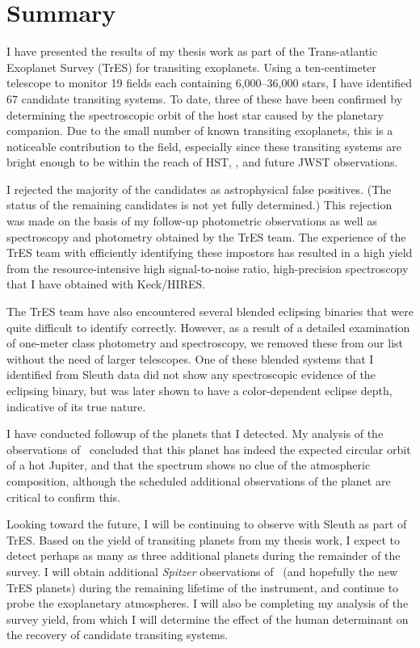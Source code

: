 \chapter[Summary]{%
Summary}
\label{cha:discuss}

I have presented the results of my thesis work as part of the Trans-atlantic Exoplanet Survey (TrES) for transiting exoplanets.
Using a ten-centimeter telescope to monitor 19 fields each containing 6,000--36,000 stars, I have identified 67 candidate transiting systems.
To date, three of these have been confirmed by determining the spectroscopic orbit of the host star caused by the planetary companion.
Due to the small number of known transiting exoplanets, this is a noticeable contribution to the field, especially since these transiting systems are bright enough to be within the reach of HST, {\spi}, and future JWST observations. 

I rejected the majority of the candidates as astrophysical false positives. 
(The status of the remaining candidates is not yet fully determined.)
This rejection was made on the basis of my follow-up photometric observations as well as spectroscopy and photometry obtained by the TrES team. 
The experience of the TrES team with efficiently identifying these impostors has resulted in a high yield from the resource-intensive high signal-to-noise ratio, high-precision spectroscopy that I have obtained with Keck/HIRES. 

The TrES team have also encountered several blended eclipsing binaries that were quite difficult to identify correctly.
However, as a result of a detailed examination of one-meter class photometry and spectroscopy, we removed these from our list without the need of larger telescopes.
One of these blended systems that I identified from Sleuth data did not show any spectroscopic evidence of the eclipsing binary, but was later shown to have a color-dependent eclipse depth, indicative of its true nature.

I have conducted followup of the planets that I detected. 
My analysis of the {\spi} observations of \tresTwo\ concluded that this planet has indeed the expected circular orbit of a hot Jupiter, and that the spectrum shows no clue of the atmospheric composition, although the scheduled additional observations of the planet are critical to confirm this. 

Looking toward the future, I will be continuing to observe with Sleuth as part of TrES. 
Based on the yield of transiting planets from my thesis work, I expect to detect perhaps as many as three additional planets during the remainder of the survey.
I will obtain additional {\it Spitzer} observations of \tresTwo\ (and hopefully the new TrES planets) during the remaining lifetime of the instrument, and continue to probe the exoplanetary atmospheres. 
I will also be completing my analysis of the survey yield, from which I will determine the effect of the human determinant on the recovery of candidate transiting systems. 


